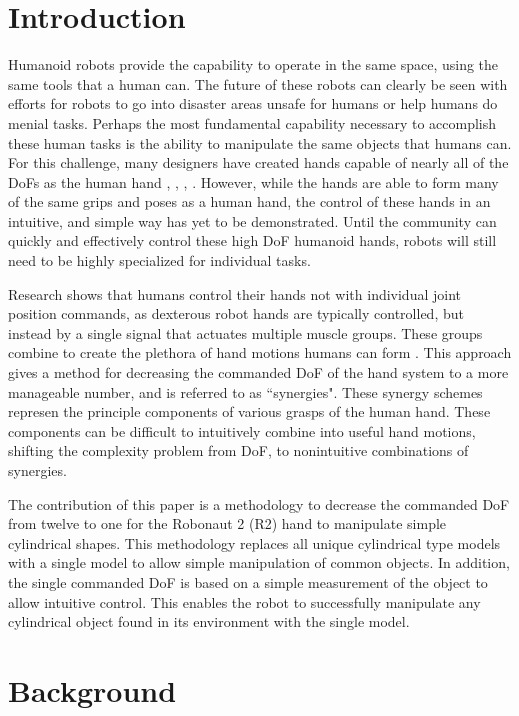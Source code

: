 \documentclass[runningheads,a4paper]{llncs}
\begin{document}
\section{Introduction}

Humanoid robots provide the capability to operate in the same space, using the same tools that a human can. The future of these robots can clearly be seen with efforts for robots to go into disaster areas unsafe for humans \cite{fukushima_robots} or help humans do menial tasks. Perhaps the most fundamental capability necessary to accomplish these human tasks is the ability to manipulate the same objects that humans can. For this challenge, many designers have created hands capable of nearly all of the DoFs as the human hand \cite{r2_hand}, \cite{DRL}, \cite{hrp3}, \cite{softhand}. However, while the hands are able to form many of the same grips and poses as a human hand, the control of these hands in an intuitive, and simple way has yet to be demonstrated. Until the community can quickly and effectively control these high DoF humanoid hands, robots will still need to be highly specialized for individual tasks. \par
Research shows that humans control their hands not with individual joint position commands, as dexterous robot hands are typically controlled, but instead by a single signal that actuates multiple muscle groups. These groups combine to create the plethora of hand motions humans can form \cite{Santello} \cite{neuro}. This approach gives a method for decreasing the commanded DoF of the hand system to a more manageable number, and is referred to as ``synergies". These synergy schemes represen the principle components of various grasps of the human hand. These components can be difficult to intuitively combine into useful hand motions, shifting the complexity problem from DoF, to nonintuitive combinations of synergies. \par
The contribution of this paper is a methodology to decrease the commanded DoF from twelve to one for the Robonaut 2 (R2) hand to manipulate simple cylindrical shapes. This methodology replaces all unique cylindrical type models with a single model to allow simple manipulation of common objects. In addition, the single commanded DoF is based on a simple measurement of the object to allow intuitive control. This enables the robot to successfully manipulate any cylindrical object found in its environment with the single model.

\section{Background}
\end{document}
